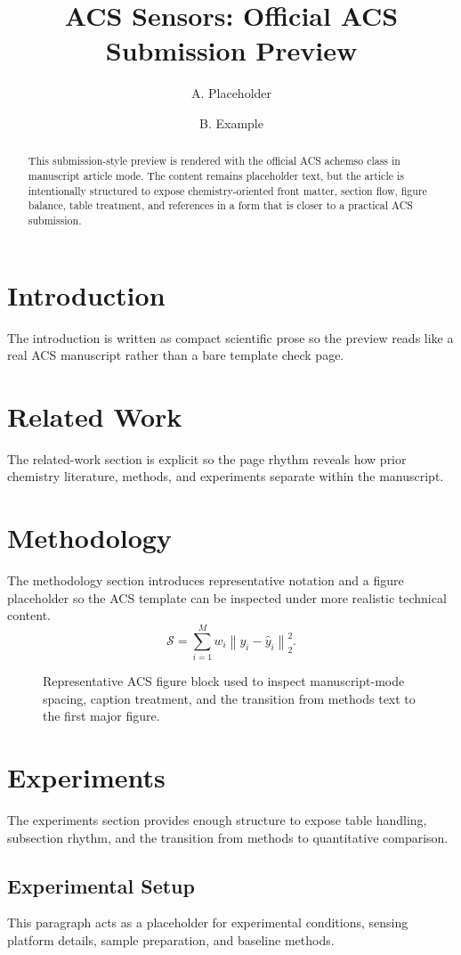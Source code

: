 \documentclass[manuscript=article]{achemso}
\author{A. Placeholder}
\affiliation{Department of Verified Templates, Placeholder Institute, Placeholder City, Country}
\author{B. Example}
\affiliation{Journal Systems Lab, Example University, Example City, Country}
\title{ACS Sensors: Official ACS Submission Preview}
\begin{document}
\begin{abstract}
This submission-style preview is rendered with the official ACS achemso class in manuscript article mode. The content remains placeholder text, but the article is intentionally structured to expose chemistry-oriented front matter, section flow, figure balance, table treatment, and references in a form that is closer to a practical ACS submission.
\end{abstract}
\section{Introduction}
The introduction is written as compact scientific prose so the preview reads like a real ACS manuscript rather than a bare template check page.
\section{Related Work}
The related-work section is explicit so the page rhythm reveals how prior chemistry literature, methods, and experiments separate within the manuscript.
\section{Methodology}
The methodology section introduces representative notation and a figure placeholder so the ACS template can be inspected under more realistic technical content.
\begin{equation}
\mathcal{S} = \sum_{i=1}^{M} w_i \left\| y_i - \hat{y}_i \right\|_2^2.
\end{equation}
\begin{figure}[ht]
\centering
{}
\caption{Representative ACS figure block used to inspect manuscript-mode spacing, caption treatment, and the transition from methods text to the first major figure.}
\end{figure}
\section{Experiments}
The experiments section provides enough structure to expose table handling, subsection rhythm, and the transition from methods to quantitative comparison.
\subsection{Experimental Setup}
This paragraph acts as a placeholder for experimental conditions, sensing platform details, sample preparation, and baseline methods.
\end{document}
